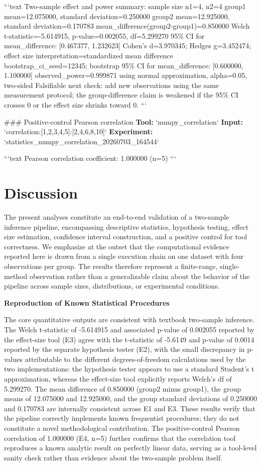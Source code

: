 \documentclass[11pt,a4paper]{article}
\begin{document}
```text
Two-sample effect and power summary:
  sample size n1=4, n2=4
  group1 mean=12.075000, standard deviation=0.250000
  group2 mean=12.925000, standard deviation=0.170783
  mean\_difference(group2-group1)=0.850000
  Welch t-statistic=-5.614915, p-value=0.002055, df=5.299270
  95\% CI for mean\_difference: [0.467377, 1.232623]
  Cohen's d=3.970345; Hedges g=3.452474; effect size interpretation=standardized mean difference
  bootstrap\_ci\_seed=12345; bootstrap 95\% CI for mean\_difference: [0.600000, 1.100000]
  observed\_power=0.999871 using normal approximation, alpha=0.05, two-sided
  Falsifiable next check: add new observations using the same measurement protocol; the group-difference claim is weakened if the 95\% CI crosses 0 or the effect size shrinks toward 0.
```

\#\#\# Positive-control Pearson correlation
\textbf{Tool:} `numpy\_correlation`
\textbf{Input:} `correlation:[1,2,3,4,5]:[2,4,6,8,10]`
\textbf{Experiment:} `statistics\_numpy\_correlation\_20260703\_164544`

```text
Pearson correlation coefficient: 1.000000 (n=5)
```


\section{Discussion}
The present analyses constitute an end-to-end validation of a two-sample inference pipeline, encompassing descriptive statistics, hypothesis testing, effect size estimation, confidence interval construction, and a positive control for tool correctness. We emphasize at the outset that the computational evidence reported here is drawn from a single execution chain on one dataset with four observations per group. The results therefore represent a finite-range, single-method observation rather than a generalizable claim about the behavior of the pipeline across sample sizes, distributions, or experimental conditions.

\textbf{Reproduction of Known Statistical Procedures}

The core quantitative outputs are consistent with textbook two-sample inference. The Welch t-statistic of -5.614915 and associated p-value of 0.002055 reported by the effect-size tool (E3) agree with the t-statistic of -5.6149 and p-value of 0.0014 reported by the separate hypothesis tester (E2), with the small discrepancy in p-values attributable to the different degrees-of-freedom calculations used by the two implementations: the hypothesis tester appears to use a standard Student's t approximation, whereas the effect-size tool explicitly reports Welch's df of 5.299270. The mean difference of 0.850000 (group2 minus group1), the group means of 12.075000 and 12.925000, and the group standard deviations of 0.250000 and 0.170783 are internally consistent across E1 and E3. These results verify that the pipeline correctly implements known frequentist procedures; they do not constitute a novel methodological contribution. The positive-control Pearson correlation of 1.000000 (E4, n=5) further confirms that the correlation tool reproduces a known analytic result on perfectly linear data, serving as a tool-level sanity check rather than evidence about the two-sample problem itself.
\end{document}
